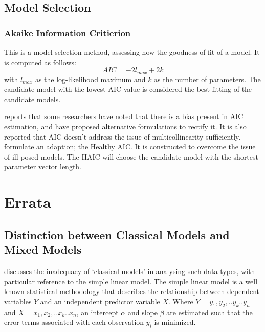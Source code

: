 \documentclass[12pt, a4paper]{report}
\begin{document}

\section{Model Selection}
\subsection{Akaike Information Critierion}
This is a model selection method, assessing how the goodness of
fit of a model. It is computed as follows:
\begin{displaymath}
      AIC = -2l_{max}+ 2k
\end{displaymath}
with $l_{max}$ as the log-likelihood maximum and $k$ as the number
of parameters. The candidate model with the lowest AIC value is
considered the best fitting of the candidate models.

\citet[p.13]{Demi} reports that some researchers have noted that
there is a bias present in AIC estimation, and have proposed
alternative formulations to rectify it. It is also reported that
AIC doesn't address the issue of multicollinearity sufficiently.
\citet{Demi} formulate an adaption; the Healthy AIC. It is
constructed to overcome the issue of ill posed models. The HAIC
will choose the candidate model with the shortest parameter vector
length.

\chapter{Errata}
\section{Distinction between Classical Models and Mixed Models}
\citet{Demi} discusses the inadequacy of `classical models' in
analysing such data types, with particular reference to the simple
linear model. The simple linear model is a well known statistical
methodology that describes the relationship between dependent
variables $Y$ and an independent predictor variable $X$. Where
$Y={y_{1},y_{2},..y_{k}..y_{n}}$ and
$X={x_{1},x_{2},..x_{k}..x_{n}}$, an intercept $\alpha$ and slope
$\beta$ are estimated such that the error terms associated with
each observation $y_{i}$ is minimized.
\end{document}
